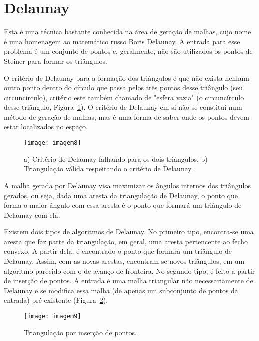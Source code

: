 \section{Delaunay}

Esta é uma técnica bastante conhecida na área de geração de malhas, cujo nome é uma homenagem ao matemático russo Boris Delaunay. A entrada para esse problema é um conjunto de pontos e, geralmente, não são utilizados os pontos de Steiner para formar os triângulos.

O critério de Delaunay para a formação dos triângulos é que não exista nenhum outro ponto dentro do círculo que passa pelos três pontos desse triângulo (seu circuncírculo), critério este também chamado de "esfera vazia" (o circuncírculo desse triângulo, Figura~\ref{fig:imagem8}). O critério de Delaunay em si não se constitui num método de geração de malhas, mas é uma forma de saber onde os pontos devem estar localizados no espaço.

 \begin{figure}[htbp]
     \centering
     \texttt{[image: imagem8]}
     \caption{a) Critério de Delaunay falhando para os dois triângulos. b) Triangulação válida respeitando o critério de Delaunay.} 
     \label{fig:imagem8}
 \end{figure}

A malha gerada por Delaunay visa maximizar os ângulos internos dos triângulos gerados, ou seja, dada uma aresta da triangulação de Delaunay, o ponto que forma o maior ângulo com essa aresta é o ponto que formará um triângulo de Delaunay com ela.

Existem dois tipos de algoritmos de Delaunay. No primeiro tipo, encontra-se uma aresta que faz parte da triangulação, em geral, uma aresta pertencente ao fecho convexo. A partir dela, é encontrado o ponto que formará um triângulo de Delaunay. Assim, com as novas arestas, encontram-se novos triângulos, em um algoritmo parecido com o de avanço de fronteira. No segundo tipo, é feito a partir de inserção de pontos. A entrada é uma malha triangular não necessariamente de Delaunay e se modifica essa malha (de apenas um subconjunto de pontos da entrada) pré-existente (Figura~\ref{fig:imagem9}).

 \begin{figure}[htbp]
     \centering
     \texttt{[image: imagem9]}
     \caption{Triangulação por inserção de pontos. \cite{bib:Freitas10}} 
     \label{fig:imagem9}
 \end{figure}

